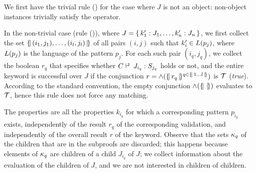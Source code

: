 We first have the trivial
rule (\rpattProps\TTriv) for the case where $J$ is not an object: non-object instances trivially satisfy the operator.


In the non-trivial case (rule (\rpattProps)), where $J = \{\,{k'_1:J_1,\ldots,k'_n:J_n}\,\}$, we first collect the set $\{\!|\,{(i_1,j_1),\ldots,(i_l,j_l)}\,|\!\}$ of all pairs
${(i,j)}$ such that $k'_i \in L(p_j)$, where $L(p_j)$ is the language of the pattern $p_j$.
For each such pair $(i_q,j_q)$, we collect the boolean $r_q$ that specifies whether $\SJudgC{J_{i_q}}{S_{j_q}}$
holds or not, and the 
entire keyword is successful over $J$ if the conjunction $r=\wedge(\{\!|\,{r_q}\,|\!\}^{{q}\in{\{\!|\,{1\ldots{l}}\,|\!\}}})$ is $\mathcal{T}$ (\emph{true}).
According to the standard convention, the empty conjunction $\wedge(\{\!|\,{}\,|\!\})$ evaluates to $\mathcal{T}$, hence this
rule does not force any matching.


%

The {\evaluated} properties are all the properties $k_{i_q}$ for which a corresponding pattern
$p_{i_q}$ exists, independently of the result $r_q$ of the corresponding validation, and independently of the overall result
$r$ of the keyword.
Observe that the sets $\kappa_q$ of the children that are {\evaluated} in the subproofs are discarded; this
happens because elements of $\kappa_q$ are children of a child $J_{i_q}$ of $J$; we collect information
about the evaluation of the children of $J$, and we are not interested in children of children.

